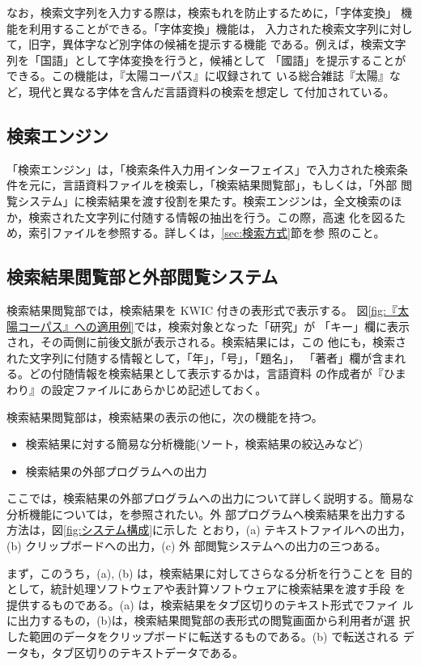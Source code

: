 なお，検索文字列を入力する際は，検索もれを防止するために，「字体変換」
機能を利用することができる。「字体変換」機能は，
入力された検索文字列に対して，旧字，異体字など別字体の候補を提示する機能
である。例えば，検索文字列を「国語」として字体変換を行うと，候補として
「國語」を提示することができる。この機能は，『太陽コーパス』に収録されて
いる総合雑誌『太陽』など，現代と異なる字体を含んだ言語資料の検索を想定し
て付加されている。



\subsection{検索エンジン}
「検索エンジン」は，「検索条件入力用インターフェイス」で入力された検索条
件を元に，言語資料ファイルを検索し，「検索結果閲覧部」，もしくは，「外部
閲覧システム」に検索結果を渡す役割を果たす。検索エンジンは，全文検索のほ
か，検索された文字列に付随する情報の抽出を行う。この際，高速
化を図るため，索引ファイルを参照する。詳しくは，\ref{sec:検索方式}節を参
照のこと。


\subsection{検索結果閲覧部と外部閲覧システム}
検索結果閲覧部では，検索結果を KWIC 付きの表形式で表示する。
図\ref{fig:『太陽コーパス』への適用例}では，検索対象となった「研究」が
「キー」欄に表示され，その両側に前後文脈が表示される。検索結果には，この
他にも，検索された文字列に付随する情報として，「年」，「号」，「題名」，
「著者」欄が含まれる。どの付随情報を検索結果として表示するかは，言語資料
の作成者が『ひまわり』の設定ファイルにあらかじめ記述しておく。

検索結果閲覧部は，検索結果の表示の他に，次の機能を持つ。

\begin{itemize}
 \item 検索結果に対する簡易な分析機能(ソート，検索結果の絞込みなど)
 \item 検索結果の外部プログラムへの出力
\end{itemize}

ここでは，検索結果の外部プログラムへの出力について詳しく説明する。簡易な
分析機能については，を参照されたい。外
部プログラムへ検索結果を出力する方法は，図\ref{fig:システム構成}に示した
とおり，(a) テキストファイルへの出力，(b) クリップボードへの出力，(c) 外
部閲覧システムへの出力の三つある。

まず，このうち，(a), (b) は，検索結果に対してさらなる分析を行うことを
目的として，統計処理ソフトウェアや表計算ソフトウェアに検索結果を渡す手段
を提供するものである。(a) は，検索結果をタブ区切りのテキスト形式でファイ
ルに出力するもの，(b)は，検索結果閲覧部の表形式の閲覧画面から利用者が選
択した範囲のデータをクリップボードに転送するものである。(b) で転送される
データも，タブ区切りのテキストデータである。

